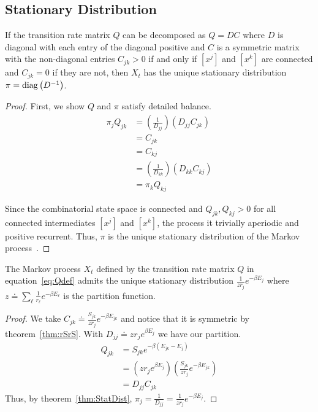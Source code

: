 \subsection{Stationary Distribution}

\begin{mythm}
\label{thm:StatDist}
If the transition rate matrix $Q$ can be decomposed as $Q = DC$ where $D$ is diagonal with each entry of the diagonal positive and $C$ is a symmetric matrix with the non-diagonal entries $C_{jk} > 0$ if and only if $[x^j]$ and $[x^k]$ are connected and $C_{jk} = 0$ if they are not, then $X_t$ has the unique stationary distribution $\pi = \operatorname{diag}\left(D^{-1}\right)$.         
\end{mythm}
\begin{proof}
First, we show $Q$ and $\pi$ satisfy detailed balance.
\begin{align}
\pi_jQ_{jk} &= \left(\frac{1}{D_{jj}}\right)\left(D_{jj}C_{jk}\right) \\
&= C_{jk} \\
&= C_{kj} \\
&= \left(\frac{1}{D_{kk}}\right)\left(D_{kk}C_{kj}\right) \\
                    &= \pi_kQ_{kj}
\end{align}

Since the combinatorial state space is connected and $Q_{jk}, Q_{kj} > 0$ for all connected intermediates $[x^j]$ and $[x^k]$, the process it trivially aperiodic and positive recurrent. Thus, $\pi$ is the unique stationary distribution of the Markov process~\cite{Norris1998}. 
\end{proof}


\begin{mythm}
\label{thm:E}
The Markov process $X_t$ defined by the transition rate matrix  $Q$ in equation~\ref{eq:Qdef} admits the unique stationary distribution $\frac{1}{zr_j}e^{-\beta E_j}$ where $z \doteq \sum_\ell \frac{1}{r_\ell}e^{-\beta E_\ell}$ is the partition function. 
\end{mythm}
\begin{proof}
We take $C_{jk} \doteq \frac{S_{jk}}{zr_j}e^{-\beta E_{jk}}$ and notice that it is symmetric by theorem~\ref{thm:rSrS}. With $D_{jj} \doteq zr_je^{\beta E_j}$ we have our partition.  
\begin{align}
Q_{jk} &= S_{jk}e^{-\beta\left(E_{jk} - E_j\right)} \\
       &= \left(zr_je^{\beta E_j}\right) \left(\frac{S_{jk}}{zr_j}e^{-\beta E_{jk}}\right) \\
       &= D_{jj}C_{jk}    
\end{align}
Thus, by theorem~\ref{thm:StatDist},  $\pi_j = \frac{1}{D_{jj}} = \frac{1}{zr_j}e^{-\beta E_j}$.
\end{proof}


